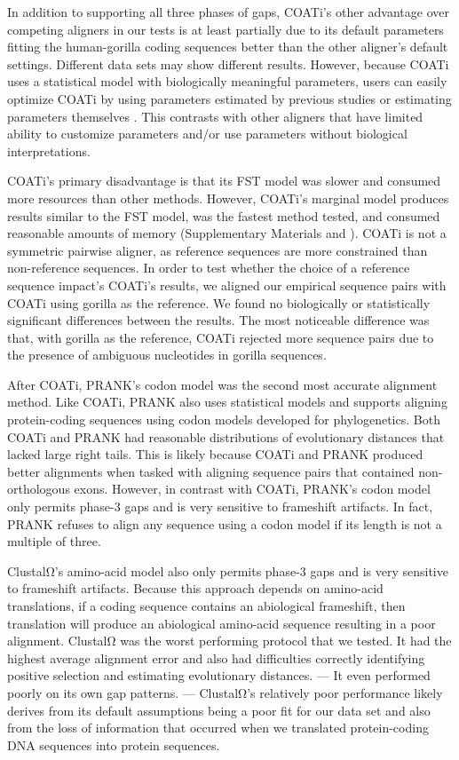 \documentclass[12pt,letterpaper]{article}
\begin{document}
In addition to supporting all three phases of gaps, COATi's other advantage over competing aligners in our tests is at least partially due to its default parameters fitting the human-gorilla coding sequences better than the other aligner's default settings. Different data sets may show different results. However, because COATi uses a statistical model with biologically meaningful parameters, users can easily optimize COATi by using parameters estimated by previous studies or estimating parameters themselves \citep[e.g.][]{zhu2022profiling}. This contrasts with other aligners that have limited ability to customize parameters and/or use parameters without biological interpretations.

COATi's primary disadvantage is that its FST model was slower and consumed more resources than other methods. However, COATi's marginal model produces results similar to the FST model, was the fastest method tested, and consumed reasonable amounts of memory (Supplementary Materials and \citealt{garcia2023dissertation}).
%
COATi is not a symmetric pairwise aligner, as reference sequences are more constrained than non-reference sequences. In order to test whether the choice of a reference sequence impact's COATi's results, we aligned our empirical sequence pairs with COATi using gorilla as the reference. We found no biologically or statistically significant differences between the results. The most noticeable difference was that, with gorilla as the reference, COATi rejected more sequence pairs due to the presence of ambiguous nucleotides in gorilla sequences.

After COATi, PRANK's codon model was the second most accurate alignment method. Like COATi, PRANK also uses statistical models and supports aligning protein-coding sequences using codon models developed for phylogenetics. Both COATi and PRANK had reasonable distributions of evolutionary distances that lacked large right tails. This is likely because COATi and PRANK produced better alignments when tasked with aligning sequence pairs that contained non-orthologous exons. However, in contrast with COATi, PRANK's codon model only permits phase-3 gaps and is very sensitive to frameshift artifacts. In fact, PRANK refuses to align any sequence using a codon model if its length is not a multiple of three.

ClustalΩ's amino-acid model also only permits phase-3 gaps and is very sensitive to frameshift artifacts. Because this approach depends on amino-acid translations, if a coding sequence contains an abiological frameshift, then translation will produce an abiological amino-acid sequence resulting in a poor alignment. ClustalΩ was the worst performing protocol that we tested. It had the highest average alignment error and also had difficulties correctly identifying positive selection and estimating evolutionary distances.  --- It even performed poorly on its own gap patterns. --- ClustalΩ's relatively poor performance likely derives from its default assumptions being a poor fit for our data set and also from the loss of information that occurred when we translated protein-coding DNA sequences into protein sequences.
\end{document}
